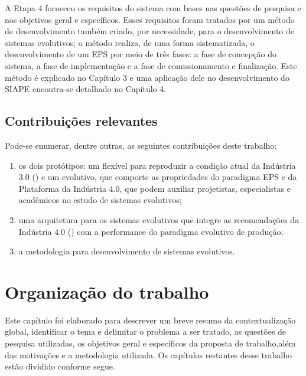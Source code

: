 A Etapa 4 forneceu os requisitos do sistema com bases nas questões de pesquisa e nos objetivos geral e específicos. Esses requisitos foram tratados por um método de desenvolvimento também criado, por necessidade, para o desenvolvimento de sistemas evolutivos; o método realiza, de uma forma sistematizada, o desenvolvimento de um EPS por meio de três fases: a fase de concepção do sistema, a fase de implementação e a fase de comissionamento e finalização. Este método é explicado no Capítulo 3 e uma aplicação dele no desenvolvimento do SIAPE encontra-se detalhado no Capítulo 4.
	 

\subsection{Contribuições relevantes } 

Pode-se enumerar, dentre outras, as seguintes contribuições deste trabalho:

\begin{enumerate}
\item os dois protótipos: um flexível para reproduzir a condição atual da Indústria 3.0 (\iTresZero) e um evolutivo, que comporte as propriedades do paradigma EPS e da Plataforma da Indústria 4.0, que podem auxiliar projetistas, especialistas e acadêmicos no estudo de sistemas evolutivos;

\item uma arquitetura para os sistemas evolutivos que integre as recomendações da Indústria 4.0 (\iQuatroZero) com a performance do paradigma evolutivo de produção;

\item a metodologia para desenvolvimento de sistemas evolutivos.
\end{enumerate}

\clearpage
\section{Organização do trabalho}



Este capítulo foi elaborado para descrever um breve resumo da contextualização global, identificar o tema e delimitar o problema a ser tratado, as questões de pesquisa utilizadas, os objetivos geral e específicos da proposta de trabalho,além das motivações e a metodologia utilizada. Os capítulos restantes desse trabalho estão dividido conforme segue. 

